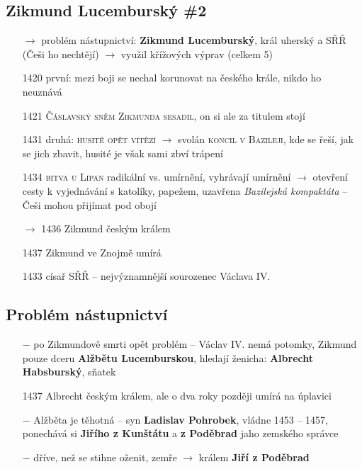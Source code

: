 \documentclass{article}
\begin{document}
\subsection*{Zikmund Lucemburský \#2}
\begin{itemize}
    \vspace{-0.5em}
    \setlength\itemsep{0.15em}
    \item[$\rightarrow$] problém nástupnictví: \textbf{Zikmund Lucemburský}, král uherský a SŘŘ (Češi ho nechtějí) $\rightarrow$ využil křížových výprav (celkem 5)
    \item[1420] první: mezi boji se nechal korunovat na českého krále, nikdo ho neuznává
    \item[1421] \textsc{Čáslavský sněm Zikmunda sesadil}, on si ale za titulem stojí
    \item[1431] druhá: \textsc{husité opět vítězí} $\rightarrow$ svolán \textsc{koncil v Bazileji}, kde se řeší, jak se jich zbavit, husité je však sami zbví trápení
    \item[1434] \textsc{bitva u Lipan} radikální vs. umírnění, vyhrávají umírnění $\rightarrow$ otevření cesty k vyjednávání s katolíky, papežem, uzavřena \textit{Bazilejská kompaktáta} -- Češi mohou přijímat pod obojí
    \item[$\rightarrow$ 1436] Zikmund českým králem
    \item[1437] Zikmund ve Znojmě umírá
    \item[1433] císař SŘŘ -- nejvýznamnější sourozenec Václava IV.
\end{itemize}


\subsection*{Problém nástupnictví}
\begin{itemize}
    \vspace{-0.5em}
    \setlength\itemsep{0.15em}
    \item[$-$] po Zikmundově smrti opět problém -- Václav IV. nemá potomky, Zikmund pouze dceru \textbf{Alžbětu Lucemburskou}, hledají ženicha: \textbf{Albrecht Habsburský}, sňatek
    \item[1437] Albrecht českým králem, ale o dva roky později umírá na úplavici
    \item[$-$] Alžběta je těhotná -- syn \textbf{Ladislav Pohrobek}, vládne 1453 -- 1457, ponechává si \textbf{Jiřího z Kunštátu} a \textbf{z Poděbrad} jaho zemského správce
    \item[$-$] dříve, než se stihne oženit, zemře $\rightarrow$ králem \textbf{Jiří z Poděbrad}



\end{itemize}
\end{document}
